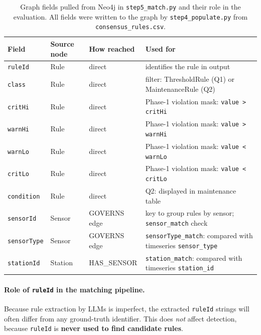 ﻿\documentclass[11pt]{article}
\begin{document}
\begin{table}[H]
\centering
\caption{Graph fields pulled from Neo4j in \texttt{step5\_match.py} and their
         role in the evaluation.  All fields were written to the graph by
         \texttt{step4\_populate.py} from \texttt{consensus\_rules.csv}.}
\label{tab:graph_fields}
\small
\begin{tabular}{@{}llll@{}}
\toprule
\textbf{Field} & \textbf{Source node} & \textbf{How reached} & \textbf{Used for} \\
\midrule
\texttt{ruleId}    & Rule   & direct       & identifies the rule in output \\
\texttt{class}     & Rule   & direct       & filter: ThresholdRule (Q1) or MaintenanceRule (Q2) \\
\texttt{critHi}    & Rule   & direct       & Phase-1 violation mask: \texttt{value > critHi} \\
\texttt{warnHi}    & Rule   & direct       & Phase-1 violation mask: \texttt{value > warnHi} \\
\texttt{warnLo}    & Rule   & direct       & Phase-1 violation mask: \texttt{value < warnLo} \\
\texttt{critLo}    & Rule   & direct       & Phase-1 violation mask: \texttt{value < critLo} \\
\texttt{condition} & Rule   & direct       & Q2: displayed in maintenance table \\
\texttt{sensorId}  & Sensor & GOVERNS edge & key to group rules by sensor; \texttt{sensor\_match} check \\
\texttt{sensorType}& Sensor & GOVERNS edge & \texttt{sensorType\_match}: compared with timeseries \texttt{sensor\_type} \\
\texttt{stationId} & Station& HAS\_SENSOR  & \texttt{station\_match}: compared with timeseries \texttt{station\_id} \\
\bottomrule
\end{tabular}
\end{table}

\paragraph{Role of \texttt{ruleId} in the matching pipeline.}
Because rule extraction by LLMs is imperfect, the extracted \texttt{ruleId}
strings will often differ from any ground-truth identifier.
This does \emph{not} affect detection, because \texttt{ruleId} is
\textbf{never used to find candidate rules}.
\end{document}
